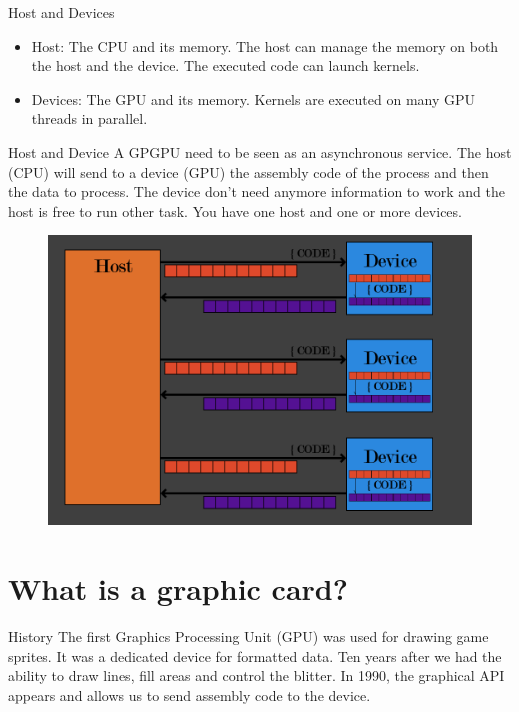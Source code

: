 \documentclass{beamer}
\begin{document}
\begin{frame}{Host and Devices}
	\begin{itemize}
		\item Host: The CPU and its memory. The host can manage the memory on both the host and the device. The executed code can launch kernels.
		\item Devices: The GPU and its memory. Kernels are executed on many GPU threads in parallel.
	\end{itemize}
\end{frame}

\begin{frame}{Host and Device}
	A GPGPU need to be seen as an asynchronous service. The host (CPU) will send to a device (GPU) the assembly code of the process and then the data to process. The device don't need anymore information to work and the host is free to run other task. You have one host and one or more devices.
	\begin{figure}
		\includegraphics[scale=0.2]{figures/host_devices.png}
	\end{figure}
\end{frame}

\section{What is a graphic card?}
\begin{frame}{History}
	The first Graphics Processing Unit (GPU) was used for drawing game sprites. It was a dedicated device for formatted data. Ten years after we had the ability to draw lines, fill areas and control the blitter. In 1990, the graphical API appears and allows us to send assembly code to the device.
\end{frame}
\end{document}
